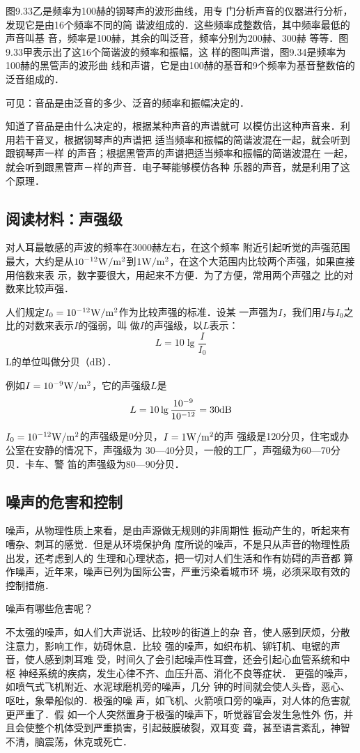 图9.33乙是频率为100赫的钢琴声的波形曲线，用专
门分析声音的仪器进行分析，发现它是由16个频率不同的简
谐波组成的．这些频率成整数倍，其中频率最低的声音叫基
音，频率是100赫，其余的叫泛音，频率分别为200赫、300赫
等等．图9.33甲表示出了这16个简谐波的频率和振幅，这
样的图叫声谱，图9.34是频率为100赫的黑管声的波形曲
线和声谱，它是由100赫的基音和9个频率为基音整数倍的
泛音组成的．

可见：音品是由泛音的多少、泛音的频率和振幅决定的．

知道了音品是由什么决定的，根据某种声音的声谱就可
以模仿出这种声音来．利用若干音叉，根据钢琴声的声谱把
适当频率和振幅的简谐波混在一起，就会听到跟钢琴声一样
的声音；根据黑管声的声谱把适当频率和振幅的简谐波混在
一起，就会听到跟黑管声－样的声音．电子琴能够模仿各种
乐器的声音，就是利用了这个原理．


\subsection*{阅读材料：声强级}
对人耳最敏感的声波的频率在3000赫左右，在这个频率
附近引起听觉的声强范围最大，大约是从$10^{-12}{\rm W}/{\rm m^2}$到$1{\rm W}/{\rm m^2}$，在这个大范围内比较两个声强，如果直接用倍数来表
示，数字要很大，用起来不方便．为了方便，常用两个声强之
比的对数来比较声强．

人们规定$I_0=10^{-12}{\rm W}/{\rm m^2}$作为比较声强的标准．设某
一声强为$I$，我们用$I$与$I_0$之比的对数来表示$I$的强弱，叫
做$I$的声强级，以$L$表示：
\[L=10\lg \frac{I}{I_0} \]
L的单位叫做分贝（dB）．

例如$I=10^{-9}{\rm W}/{\rm m^2}$，它的声强级$L$是
\[L=10\lg \frac{10^{-9}}{10^{-12}}=30{\rm dB} \]

$I_0=10^{-12}{\rm W}/{\rm m^2}$的声强级是0分贝，$I=1{\rm W}/{\rm m^2}$的声
强级是120分贝，住宅或办公室在安静的情况下，声强级为
30—40分贝，一般的工厂，声强级为60—70分贝．卡车、警
笛的声强级为80—90分贝．

\subsection{噪声的危害和控制}
噪声，从物理性质上来看，是由声源做无规则的非周期性
振动产生的，听起来有嘈杂、刺耳的感觉．但是从环境保护角
度所说的噪声，不是只从声音的物理性质出发，还考虑到人的
生理和心理状态，把一切对人们生活和作有妨碍的声音都
算作噪声，近年来，噪声已列为国际公害，严重污染着城市环
境，必须采取有效的控制措施．

噪声有哪些危害呢？

不太强的噪声，如人们大声说话、比较吵的街道上的杂
音，使人感到厌烦，分散注意力，影响工作，妨碍休息．比较
强的噪声，如织布机、铆钉机、电锯的声音，使人感到刺耳难
受，时间久了会引起噪声性耳聋，还会引起心血管系统和中枢
神经系统的疾病，发生心律不齐、血压升高、消化不良等症状．
更强的噪声，如喷气式飞机附近、水泥球磨机旁的噪声，几分
钟的时间就会使人头昏，恶心、呕吐，象晕船似的．极强的噪
声，如飞机、火箭喷口旁的噪声，对人体的危害就更严重了．假
如一个人突然置身于极强的噪声下，听觉器官会发生急性外
伤，并且会使整个机体受到严重损害，引起鼓膜破裂，双耳变
聋，甚至语言紊乱，神智不清，脑震荡，休克或死亡．


